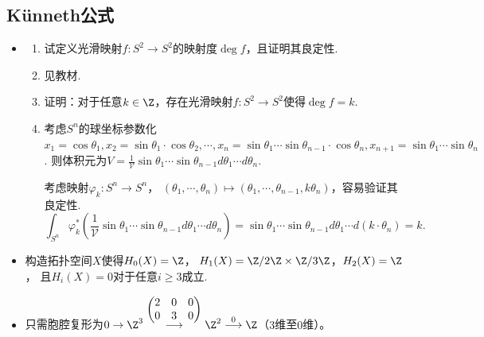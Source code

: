 \subsection{Künneth公式}
\begin{itemize}
    \item[6.2]
    \begin{enumerate}
        \item[(a)] 试定义光滑映射$f:S^{2} \to S^{2}$的映射度$\deg f$，且证明其良定性.
        \item[\textbf{定义：}] 见教材.
 

        \item[(b)] 证明：对于任意$k \in \Z$，存在光滑映射$f:S^{2} \to S^{2}$使得$\deg f = k$.
        \item[\textbf{证明：}] 
            \qquad 考虑$S^n$的球坐标参数化
                $x_1=\cos \theta_1, x_2=\sin \theta_1\cdot \cos \theta_2,\cdots, 
                x_n=\sin \theta_1 \cdots \sin \theta_{n-1}\cdot \cos \theta_n, 
                x_{n+1}=\sin \theta_1\cdots \sin \theta_n$. 
                则体积元为$V=\frac{1}{\mathscr{V}}\sin \theta_1\cdots \sin \theta_{n-1} d\theta_1\cdots d\theta_n$.\par
            \qquad 考虑映射$\varphi_k:S^n\rightarrow S^n$，
                $(\theta_1,\cdots,\theta_n)\mapsto (\theta_1,\cdots,\theta_{n-1},k\theta_n)$，容易验证其良定性.
                $$\int_{S^n} \varphi_k^*(\frac{1}{\mathscr{V}} 
                \sin \theta_1\cdots \sin \theta_{n-1} d\theta_1\cdots d\theta_n)
                =\sin \theta_1\cdots \sin \theta_{n-1} d\theta_1\cdots d(k\cdot\theta_n)=k.$$
    \end{enumerate}
    
    \item[(3)] 构造拓扑空间$X$使得$H_{0}(X) = \Z$，
    $H_{1}(X) = \Z/2\Z \times \Z/3\Z$，$H_{2}(X) = \Z$，
    且$H_{i}(X) = 0$对于任意$i \geq 3$成立.
    \item[\textbf{解：}] 只需胞腔复形为$0\to\Z^3
    \stackrel{\begin{pmatrix}2&0&0\\0&3&0\end{pmatrix}}{\longrightarrow}
    \Z^2\stackrel{0}{\longrightarrow}\Z$（$3$维至$0$维）。
\end{itemize}

